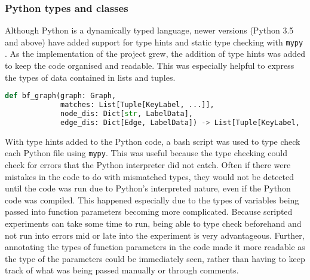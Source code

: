 \subsubsection{Python types and classes}
Although Python is a dynamically typed language, newer versions (Python 3.5 and above) have added support for type hints and static type checking with \texttt{mypy} \cite{mypy}. As the implementation of the project grew, the addition of type hints was added to keep the code organised and readable. This was especially helpful to express the types of data contained in lists and tuples.
\begin{lstlisting}[language=Python, caption={Example of a function definition with added type hints. The types from Python's \texttt{typing} class are highlighted here in red.}]
def bf_graph(graph: Graph,
             matches: List[Tuple[KeyLabel, ...]],
             node_dis: Dict[str, LabelData],
             edge_dis: Dict[Edge, LabelData]) -> List[Tuple[KeyLabel, ...]]:
\end{lstlisting}
With type hints added to the Python code, a bash script was used to type check each Python file using \texttt{mypy}. This was useful because the type checking could check for errors that the Python interpreter did not catch. Often if there were mistakes in the code to do with mismatched types, they would not be detected until the code was run due to Python's interpreted nature, even if the Python code was compiled. This happened especially due to the types of variables being passed into function parameters becoming more complicated. Because scripted experiments can take some time to run, being able to type check beforehand and not run into errors mid or late into the experiment is very advantageous. Further, annotating the types of function parameters in the code made it more readable as the type of the parameters could be immediately seen, rather than having to keep track of what was being passed manually or through comments. 

